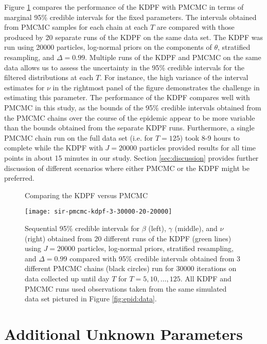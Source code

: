 Figure \ref{fig:epid:pmcmc} compares the performance of the KDPF with PMCMC in terms of marginal 95\% credible intervals for the fixed parameters. The intervals obtained from PMCMC samples for each chain at each $T$ are compared with those produced by 20 separate runs of the KDPF on the same data set. The KDPF was run using 20000 particles, log-normal priors on the components of $\theta$, stratified resampling, and $\Delta = 0.99$. Multiple runs of the KDPF and PMCMC on the same data allows us to assess the uncertainty in the 95\% credible intervals for the filtered distributions at each $T$. For instance, the high variance of the interval estimates for $\nu$ in the rightmost panel of the figure demonstrates the challenge in estimating this parameter. The performance of the KDPF compares well with PMCMC in this study, as the bounds of the 95\% credible intervals obtained from the PMCMC chains over the course of the epidemic appear to be more variable than the bounds obtained from the separate KDPF runs. Furthermore, a single PMCMC chain run on the full data set (i.e. for $T = 125$) took 8-9 hours to complete while the KDPF with $J = 20000$ particles provided results for all time points in about 15 minutes in our study. Section \ref{sec:discussion} provides further discussion of different scenarios where either PMCMC or the KDPF might be preferred.

\begin{figure}
\ssp
\centering
\caption{Comparing the KDPF versus PMCMC} \label{fig:epid:pmcmc}
\texttt{[image: sir-pmcmc-kdpf-3-30000-20-20000]}
\caption{Sequential 95\% credible intervals for $\beta$ (left), $\gamma$ (middle), and $\nu$ (right) obtained from 20 different runs of the KDPF (green lines) using $J = 20000$ particles, log-normal priors, stratified resampling, and $\Delta = 0.99$ compared with 95\% credible intervals obtained from 3 different PMCMC chains (black circles) run for 30000 iterations on data collected up until day $T$ for $T = 5,10,\ldots,125$. All KDPF and PMCMC runs used observations taken from the same simulated data set pictured in Figure \ref{fig:epid:data}.}
\end{figure}

\section{Additional Unknown Parameters} \label{sec:epid:extend}

